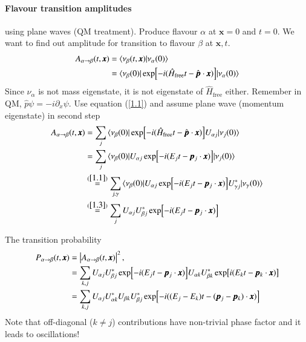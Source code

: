 \paragraph{Flavour transition amplitudes} using plane waves (QM treatment). Produce flavour $\alpha$ at $\pmb{x} = 0$ and $t=0$. We want to find out amplitude for transition to flavour $\beta$ at $\pmb{x}, t$.
\begin{align}
   A_{\alpha \rightarrow \beta} (t, \pmb{x}) &= \braket{\nu_\beta (t,\pmb{x}) | \nu_\alpha(0)} \\
                                             &= \braket{\nu_\beta (0)| \exp[-i(\hat{H}_\text{free} t - \hat{\pmb{p}} \cdot \pmb{x})] | \nu_\alpha (0)} \notag
\end{align}
Since $\nu_\alpha$ is not mass eigenstate, it is not eigenstate of $\hat{H}_\text{free}$ either. Remember in QM, $\hat{p}\psi = -i \partial_x \psi$. Use equation (\ref{1.1}) and assume plane wave (momentum eigenstate) in second step
\begin{align}
   A_{\alpha \rightarrow \beta } (t, \pmb{x}) &= \sum_{j} \braket{\nu_\beta (0)| \exp[-i(\hat{H}_\text{free} t - \hat{\pmb{p}} \cdot \pmb{x})] U_{\alpha j}| \nu_j (0)} \notag \\
                                              &= \sum_{j} \braket{\nu_\beta (0)|U_{\alpha j} \exp[-i(E_j t - \pmb{p}_j \cdot \pmb{x})] | \nu_j (0)} \notag \\
                                              &\stackrel{(\ref{1.1})}{=} \sum_{j,\gamma} \braket{\nu_\beta(0) | U_{\alpha j} \exp[-i(E_j t - \pmb{p}_j \cdot \pmb{x})] U^*_{\gamma j} | \nu_\gamma (0)} \notag \\
                                              &\stackrel{(\ref{1.3})}{=} \sum_j U_{\alpha j} U^*_{\beta j} \exp[-i(E_j t - \pmb{p}_j \cdot \pmb{x})] \label{1.6}
\end{align}

The transition probability
\begin{align}
   P_{\alpha \rightarrow \beta}(t, \pmb{x}) &= \left| A_{\alpha \rightarrow \beta} (t, \pmb{x}) \right|^2, \notag \\
                                            & = \sum_{k,j} U_{\alpha j} U^*_{\beta j} \exp[-i(E_j t - \pmb{p}_j \cdot \pmb{x})] U_{\alpha k} U^*_{\beta k} \exp[i(E_k t - \pmb{p}_k \cdot \pmb{x})] \notag \\
                                            &= \sum_{k,j} U_{\alpha j} U^*_{\alpha k} U_{\beta k} U^*_{\beta j} \exp[-i((E_j - E_k) t - (\pmb{p}_j - \pmb{p}_k) \cdot \pmb{x})] \label{1.7}
\end{align}
Note that off-diagonal ($k\neq j$) contributions have non-trivial phase factor and it leads to oscillations!


